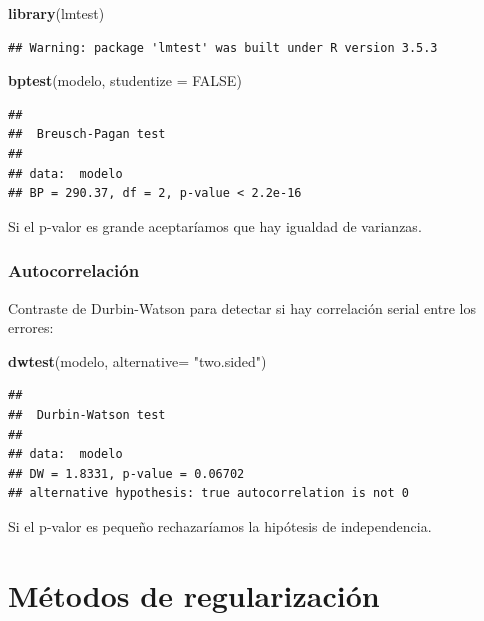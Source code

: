 \documentclass[]{book}
\newenvironment{Shaded}{\begin{snugshade}}{\end{snugshade}}
\newcommand{\KeywordTok}[1]{\textcolor[rgb]{0.13,0.29,0.53}{\textbf{#1}}}
\newcommand{\DataTypeTok}[1]{\textcolor[rgb]{0.13,0.29,0.53}{#1}}
\newcommand{\StringTok}[1]{\textcolor[rgb]{0.31,0.60,0.02}{#1}}
\newcommand{\OtherTok}[1]{\textcolor[rgb]{0.56,0.35,0.01}{#1}}
\newcommand{\NormalTok}[1]{#1}
\begin{document}
\begin{Shaded}
\begin{Highlighting}[]
\KeywordTok{library}\NormalTok{(lmtest)}
\end{Highlighting}
\end{Shaded}

\begin{verbatim}
## Warning: package 'lmtest' was built under R version 3.5.3
\end{verbatim}

\begin{Shaded}
\begin{Highlighting}[]
\KeywordTok{bptest}\NormalTok{(modelo, }\DataTypeTok{studentize =} \OtherTok{FALSE}\NormalTok{)}
\end{Highlighting}
\end{Shaded}

\begin{verbatim}
## 
##  Breusch-Pagan test
## 
## data:  modelo
## BP = 290.37, df = 2, p-value < 2.2e-16
\end{verbatim}

Si el p-valor es grande aceptaríamos que hay igualdad de varianzas.

\subsubsection{Autocorrelación}\label{autocorrelacion}

Contraste de Durbin-Watson para detectar si hay correlación serial entre
los errores:

\begin{Shaded}
\begin{Highlighting}[]
\KeywordTok{dwtest}\NormalTok{(modelo, }\DataTypeTok{alternative=} \StringTok{"two.sided"}\NormalTok{)}
\end{Highlighting}
\end{Shaded}

\begin{verbatim}
## 
##  Durbin-Watson test
## 
## data:  modelo
## DW = 1.8331, p-value = 0.06702
## alternative hypothesis: true autocorrelation is not 0
\end{verbatim}

Si el p-valor es pequeño rechazaríamos la hipótesis de independencia.

\section{Métodos de regularización}\label{metodos-de-regularizacion}
\end{document}
